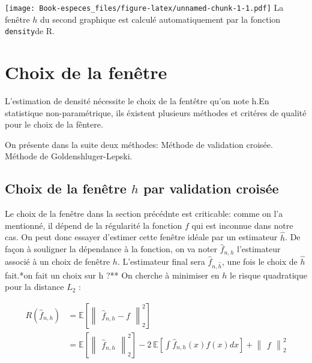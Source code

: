 \documentclass[
]{book}
\begin{document}
\texttt{[image: Book-especes\_files/figure-latex/unnamed-chunk-1-1.pdf]}
La fenêtre \(h\) du second graphique est calculé automatiquement par la fonction \texttt{density}de R.

\hypertarget{choix-de-la-fenuxeatre}{%
\section{Choix de la fenêtre}\label{choix-de-la-fenuxeatre}}

L'estimation de densité nécessite le choix de la fentêtre qu'on note h.\newline En statistique non-paramétrique, ils éxistent plusieurs méthodes et critéres de qualité pour le choix de la fêntere.\newline

On présente dans la suite deux méthodes:\newline
\hspace*{0.5cm} Méthode de validation croisée.\newline
\hspace*{0.5cm} Méthode de Goldenshluger-Lepski.\newline

\hypertarget{choix-de-la-fenuxeatre-h-par-validation-croisuxe9e}{%
\subsection{\texorpdfstring{Choix de la fenêtre \(h\) par validation croisée}{Choix de la fenêtre h par validation croisée}}\label{choix-de-la-fenuxeatre-h-par-validation-croisuxe9e}}

Le choix de la fenêtre dans la section précédnte est criticable: comme on l'a mentionné, il dépend de la régularité la fonction \(f\) qui est inconnue dans notre cas. On peut donc essayer d'estimer cette fenêtre idéale par un estimateur \(\hat{h}\). De façon à souligner la dépendance à la fonction, on va noter \(\hat{f}_{n,h}\) l'estimateur associé à un choix de fenêtre \(h\). L'estimateur final sera \(\hat{f}_{n,\hat{h}}\), une fois le choix de \(\hat{h}\) fait.\newline       **on fait un choix sur h ?**
On cherche à minimiser en \(h\) le risque quadratique pour la distance \(L_2\) :

\[
\begin{aligned}
R(\hat {f}_{n,h})&=\mathbb{E}[\begin{Vmatrix}\hat {f}_{n,h}-f\end{Vmatrix}_2^2]\\        
&= \mathbb{E}[\begin{Vmatrix}\hat {f}_{n,h}\end{Vmatrix}_2^2] -2~\mathbb{E}[\int \hat {f}_{n,h}(x)f(x)dx] +\begin{Vmatrix}f\end{Vmatrix}_2^2
\end{aligned}
\]
\end{document}
